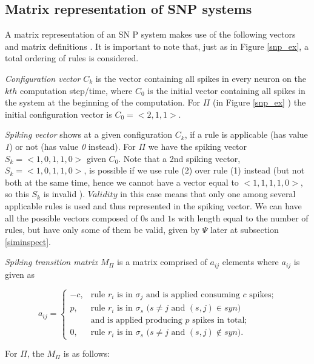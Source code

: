 \documentclass{svmultm}
\begin{document}
\subsection{Matrix representation of SNP systems}
A matrix representation of an SN P system makes use of the
following vectors and matrix definitions \cite{snpbrain,snpmat} . It is important to note that, just as in Figure \ref{snp_ex}, a total ordering of rules is {considered}.

\textit{Configuration vector} $C_k$ is the vector containing all spikes in every neuron on the $kth$ computation step/time, where $C_0$ is the initial vector containing all spikes in the system at the beginning of the computation. For $\Pi$ (in Figure \ref{snp_ex} ) the initial configuration vector is $C_0 = < 2, 1, 1 >$.

\textit{Spiking vector} shows at a given configuration $C_k$, if a
rule is applicable (has value \textit{1}) or not (has value \textit{0} instead). For $\Pi$ we have the
spiking vector $S_k = < 1, 0, 1, 1, 0 >$ given $C_0$.
Note that a 2nd spiking vector, $S_k = < 1, 0, 1, 1, 0 >$, is
possible if we use rule (2) over rule (1) instead (but not both at the same time, hence we cannot have a vector equal to
$< 1, 1, 1, 1, 0>${, so this $S_k$ is invalid }{}). $Validity$ in this case means that only one among several applicable rules is used and thus represented in the spiking vector. We can have all the possible vectors composed of $0$s and $1$s with length equal to the number of rules, but have only some of them be valid, given by $\Psi$ later at subsection \ref{siminspect}.

\textit{Spiking transition matrix} $M_{\Pi}$ is a matrix comprised of $a_{ij}$
elements where $a_{ij}$ is given as


\begin{definition}\label{defi-snp-mat}
$$
a_{ij} = \left\{
\begin{array}{rl}
-c, &\mbox{rule $r_i$ is in $\sigma_j$ and is applied consuming $c$ spikes;} \\
 p, &\mbox{rule $r_i$ is in $\sigma_s$ ($s\neq j$ and $(s,j)\in syn$)} \\
 & \mbox{and is applied producing $p$ spikes in total;}\\
 0, &\mbox{rule $r_i$ is in $\sigma_s$ ($s\neq j$ and $(s,j)\notin syn$).}
    \end{array}
\right.
$$
\end{definition}

For $\Pi$, the $M_{\Pi}$ is as follows:
\end{document}

